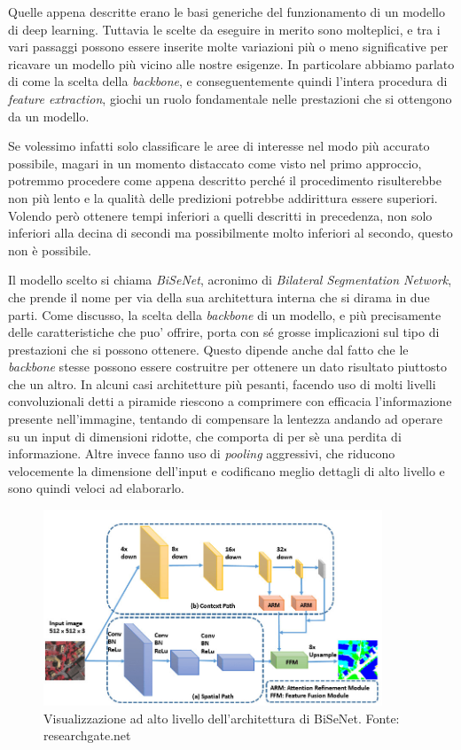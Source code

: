 Quelle appena descritte erano le basi generiche del funzionamento
di un modello di deep learning.
Tuttavia le scelte da eseguire in merito sono molteplici, e tra i vari
passaggi possono essere inserite molte variazioni più o meno
significative per ricavare un modello più vicino alle nostre esigenze.
In particolare abbiamo parlato di come la scelta della {\it backbone},
e conseguentemente quindi l'intera procedura di {\it feature extraction},
giochi un ruolo fondamentale nelle prestazioni che si ottengono da un modello.

Se volessimo infatti solo classificare le aree di interesse nel modo
più accurato possibile, magari in un momento distaccato come visto
nel primo approccio, potremmo procedere come appena descritto perché il
procedimento risulterebbe non più lento e la qualità delle predizioni
potrebbe addirittura essere superiori.
Volendo però ottenere tempi inferiori a quelli descritti in
precedenza, non solo inferiori alla decina di secondi ma possibilmente
molto inferiori al secondo, questo non è possibile.

Il modello scelto si chiama {\it BiSeNet}\cite{bisenet}, acronimo di
{\it Bilateral Segmentation Network}, che prende il nome per via
della sua architettura interna che si dirama in due parti.
Come discusso, la scelta della {\it backbone} di un modello, e più
precisamente delle caratteristiche che puo' offrire,
porta con sé grosse implicazioni sul tipo di prestazioni che si
possono ottenere.
Questo dipende anche dal fatto che le {\it backbone} stesse possono
essere costruitre per ottenere un dato risultato piuttosto che un
altro.
In alcuni casi architetture più pesanti, facendo uso di molti
livelli convoluzionali detti a piramide riescono a comprimere
con efficacia l'informazione presente nell'immagine,
tentando di compensare la lentezza andando ad operare su un
input di dimensioni ridotte, che comporta di per sè una perdita
di informazione.
Altre invece fanno uso di {\it pooling} aggressivi, che riducono
velocemente la dimensione dell'input e codificano meglio
dettagli di alto livello e sono quindi veloci ad elaborarlo.

\begin{figure}
    \center
    \includegraphics[width=0.9\textwidth]{./assets/bisenet.jpg}
    \caption{\label{fig:bisenet}Visualizzazione ad alto livello dell'architettura di BiSeNet. Fonte: researchgate.net}
\end{figure}

